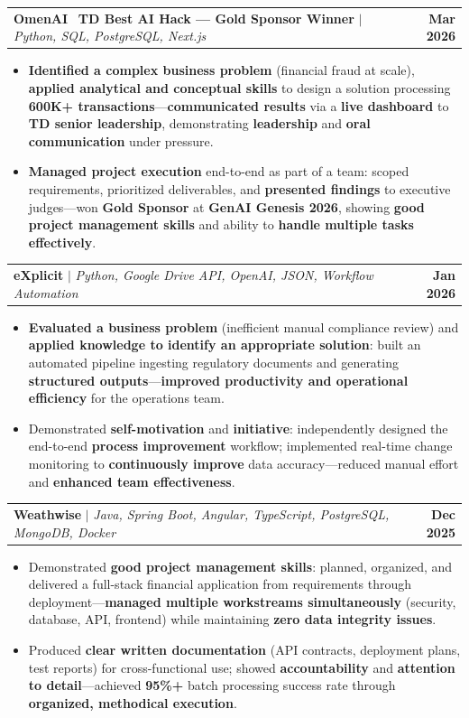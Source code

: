 \documentclass[letterpaper,10pt]{article}
\makeatletter
\newcommand{\resumeItem}[1]{
  \item\small{
    {#1 \vspace{-1pt}}
  }
}
\newcommand{\resumeProjectHeading}[2]{
    \item
    \begin{tabular*}{1.001\textwidth}{l@{\extracolsep{\fill}}r}
      \small#1 & \textbf{\small #2}\\
    \end{tabular*}\vspace{-9pt}
}
\newcommand{\resumeItemListStart}{\begin{itemize}[leftmargin=0.15in]}
\newcommand{\resumeItemListEnd}{\end{itemize}\vspace{-4pt}}
\makeatother
\begin{document}
    \resumeProjectHeading
          {\textbf{OmenAI} \textbar\ \textbf{TD Best AI Hack --- Gold Sponsor Winner} $|$ \emph{Python, SQL, PostgreSQL, Next.js}}{Mar 2026}
    \resumeItemListStart
        \resumeItem{\textbf{Identified a complex business problem} (financial fraud at scale), \textbf{applied analytical and conceptual skills} to design a solution processing \textbf{600K+ transactions}---\textbf{communicated results} via a \textbf{live dashboard} to \textbf{TD senior leadership}, demonstrating \textbf{leadership} and \textbf{oral communication} under pressure.}
        \vspace{-2pt}
        \resumeItem{\textbf{Managed project execution} end-to-end as part of a team: scoped requirements, prioritized deliverables, and \textbf{presented findings} to executive judges---won \textbf{Gold Sponsor} at \textbf{GenAI Genesis 2026}, showing \textbf{good project management skills} and ability to \textbf{handle multiple tasks effectively}.}
    \resumeItemListEnd
    \vspace{-18pt}

    \resumeProjectHeading
        {\textbf{eXplicit} $|$ \emph{Python, Google Drive API, OpenAI, JSON, Workflow Automation}}{Jan 2026}
        \resumeItemListStart
            \resumeItem{\textbf{Evaluated a business problem} (inefficient manual compliance review) and \textbf{applied knowledge to identify an appropriate solution}: built an automated pipeline ingesting regulatory documents and generating \textbf{structured outputs}---\textbf{improved productivity and operational efficiency} for the operations team.}
            \vspace{-2pt}
            \resumeItem{Demonstrated \textbf{self-motivation} and \textbf{initiative}: independently designed the end-to-end \textbf{process improvement} workflow; implemented real-time change monitoring to \textbf{continuously improve} data accuracy---reduced manual effort and \textbf{enhanced team effectiveness}.}
        \resumeItemListEnd
    \vspace{-18pt}

    \resumeProjectHeading
        {\textbf{Weathwise} $|$ \emph{Java, Spring Boot, Angular, TypeScript, PostgreSQL, MongoDB, Docker}}{Dec 2025}
        \resumeItemListStart
            \resumeItem{Demonstrated \textbf{good project management skills}: planned, organized, and delivered a full-stack financial application from requirements through deployment---\textbf{managed multiple workstreams simultaneously} (security, database, API, frontend) while maintaining \textbf{zero data integrity issues}.}
            \vspace{-2pt}
            \resumeItem{Produced \textbf{clear written documentation} (API contracts, deployment plans, test reports) for cross-functional use; showed \textbf{accountability} and \textbf{attention to detail}---achieved \textbf{95\%+} batch processing success rate through \textbf{organized, methodical execution}.}
        \resumeItemListEnd
    \vspace{-8pt}
\end{document}
